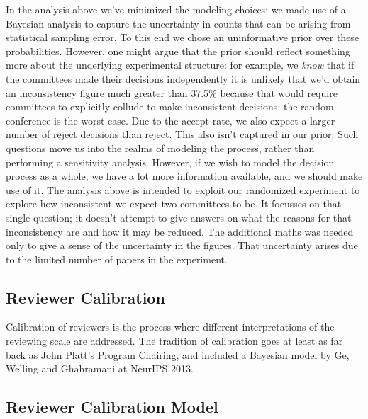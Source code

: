 In the analysis above we've minimized the modeling choices: we made use
of a Bayesian analysis to capture the uncertainty in counts that can be
arising from statistical sampling error. To this end we chose an
uninformative prior over these probabilities. However, one might argue
that the prior should reflect something more about the underlying
experimental structure: for example, we \emph{know} that if the
committees made their decisions independently it is unlikely that we'd
obtain an inconsistency figure much greater than 37.5\% because that
would require committees to explicitly collude to make inconsistent
decisions: the random conference is the worst case. Due to the accept
rate, we also expect a larger number of reject decisions than reject.
This also isn't captured in our prior. Such questions move us into the
realms of modeling the process, rather than performing a sensitivity
analysis. However, if we wish to model the decision process as a whole,
we have a lot more information available, and we should make use of it.
The analysis above is intended to exploit our randomized experiment to
explore how inconsistent we expect two committees to be. It focusses on
that single question; it doesn't attempt to give answers on what the
reasons for that inconsistency are and how it may be reduced. The
additional maths was needed only to give a sense of the uncertainty in
the figures. That uncertainty arises due to the limited number of papers
in the experiment.

\hypertarget{reviewer-calibration}{%
\subsection{Reviewer Calibration}\label{reviewer-calibration}}

\begin{flushright}
\end{flushright}

Calibration of reviewers is the process where different interpretations
of the reviewing scale are addressed. The tradition of calibration goes
at least as far back as John Platt's Program Chairing, and included a
Bayesian model by Ge, Welling and Ghahramani at NeurIPS 2013.

\hypertarget{reviewer-calibration-model}{%
\subsection{Reviewer Calibration
Model}\label{reviewer-calibration-model}}

